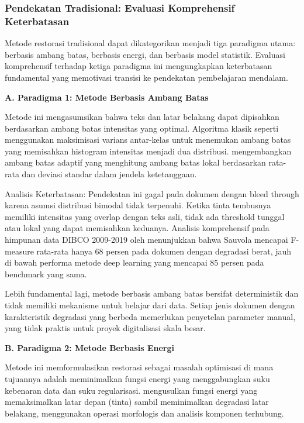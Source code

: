 \subsubsection{Pendekatan Tradisional: Evaluasi Komprehensif Keterbatasan}
\label{subsubsec:pendekatan-tradisional}

\vspace{1.5ex}

Metode restorasi tradisional dapat dikategorikan menjadi tiga paradigma utama: berbasis ambang batas, berbasis energi, dan berbasis model statistik. Evaluasi komprehensif terhadap ketiga paradigma ini mengungkapkan keterbatasan fundamental yang memotivasi transisi ke pendekatan pembelajaran mendalam.

\vspace{0.5ex}
\noindent\textbf{A. Paradigma 1: Metode Berbasis Ambang Batas}

Metode ini mengasumsikan bahwa teks dan latar belakang dapat dipisahkan berdasarkan ambang batas intensitas yang optimal. Algoritma klasik seperti \citep{otsu1979} menggunakan maksimisasi varians antar-kelas untuk menemukan ambang batas yang memisahkan histogram intensitas menjadi dua distribusi. \citep{sauvola2000} mengembangkan ambang batas adaptif yang menghitung ambang batas lokal berdasarkan rata-rata dan deviasi standar dalam jendela ketetanggaan.

Analisis Keterbatasan: Pendekatan ini gagal pada dokumen dengan bleed through karena asumsi distribusi bimodal tidak terpenuhi. Ketika tinta tembusnya memiliki intensitas yang overlap dengan teks asli, tidak ada threshold tunggal atau lokal yang dapat memisahkan keduanya. Analisis komprehensif pada himpunan data DIBCO 2009-2019 oleh \citep{pratikakis2019} menunjukkan bahwa Sauvola mencapai F-measure rata-rata hanya 68 persen pada dokumen dengan degradasi berat, jauh di bawah performa metode deep learning yang mencapai 85 persen pada benchmark yang sama.

Lebih fundamental lagi, metode berbasis ambang batas bersifat deterministik dan tidak memiliki mekanisme untuk belajar dari data. Setiap jenis dokumen dengan karakteristik degradasi yang berbeda memerlukan penyetelan parameter manual, yang tidak praktis untuk proyek digitalisasi skala besar.

\vspace{0.5ex}
\noindent\textbf{B. Paradigma 2: Metode Berbasis Energi}

Metode ini memformulasikan restorasi sebagai masalah optimisasi di mana tujuannya adalah meminimalkan fungsi energi yang menggabungkan suku kebenaran data dan suku regularisasi. \citep{gatos2006} mengusulkan fungsi energi yang memaksimalkan latar depan (tinta) sambil meminimalkan degradasi latar belakang, menggunakan operasi morfologis dan analisis komponen terhubung.

